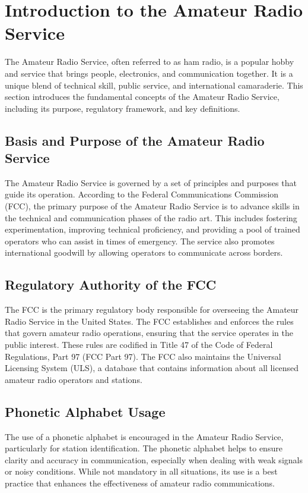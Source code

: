 \section{Introduction to the Amateur Radio Service}
\label{sec:intro_amateur_radio}

The Amateur Radio Service, often referred to as ham radio, is a popular hobby and service that brings people, electronics, and communication together. It is a unique blend of technical skill, public service, and international camaraderie. This section introduces the fundamental concepts of the Amateur Radio Service, including its purpose, regulatory framework, and key definitions.

\subsection*{Basis and Purpose of the Amateur Radio Service}
The Amateur Radio Service is governed by a set of principles and purposes that guide its operation. According to the Federal Communications Commission (FCC), the primary purpose of the Amateur Radio Service is to advance skills in the technical and communication phases of the radio art. This includes fostering experimentation, improving technical proficiency, and providing a pool of trained operators who can assist in times of emergency. The service also promotes international goodwill by allowing operators to communicate across borders.

\subsection*{Regulatory Authority of the FCC}
The FCC is the primary regulatory body responsible for overseeing the Amateur Radio Service in the United States. The FCC establishes and enforces the rules that govern amateur radio operations, ensuring that the service operates in the public interest. These rules are codified in Title 47 of the Code of Federal Regulations, Part 97 (FCC Part 97). The FCC also maintains the Universal Licensing System (ULS), a database that contains information about all licensed amateur radio operators and stations.

\subsection*{Phonetic Alphabet Usage}
The use of a phonetic alphabet is encouraged in the Amateur Radio Service, particularly for station identification. The phonetic alphabet helps to ensure clarity and accuracy in communication, especially when dealing with weak signals or noisy conditions. While not mandatory in all situations, its use is a best practice that enhances the effectiveness of amateur radio communications.


